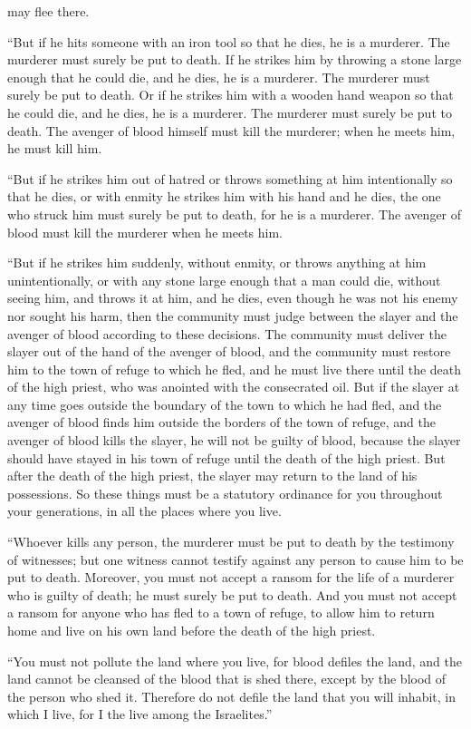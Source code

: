 {may flee
there.
\par }{\PP {}“But if
he hits someone
with an iron
tool
so
that he dies,
he is a murderer.
The murderer
must surely be put
to death.
If
he strikes
him by throwing a stone
large enough
that
he could
die,
and he dies,
he is a murderer.
The murderer
must surely be put to death.
Or
if he strikes
him
with
a wooden
hand
weapon
so that he could die,
and he dies,
he is a murderer.
The murderer
must surely be put to death.
The avenger
of blood
himself
must kill
the murderer;
when he meets
him, he must kill him.
\par }{\PP {}“But if
he strikes
him out
of hatred
or
throws
something at him intentionally
so that he dies,
or
with enmity
he strikes
him with his hand
and he dies,
the one who struck
him must
surely be put to death,
for he is
a murderer.
The avenger
of blood
must kill
the
murderer
when he meets him.
\par }{\PP {}“But if
he strikes
him suddenly,
without
enmity,
or
throws
anything
at him unintentionally,
or
with any
stone
large enough that
a man could die,
without seeing
him, and throws
it at
him,
and he dies,
even though
he was not
his enemy
nor
sought
his harm,
then the community
must judge
between
the slayer
and the avenger
of blood
according
to these
decisions.
The community
must deliver
the slayer
out of the hand
of the avenger
of blood,
and the
community
must restore
him to
the town
of refuge
to which
he fled,
and he must live
there
until
the death
of the high
priest,
who
was anointed
with the consecrated
oil.
But if
the slayer
at any time
goes outside
the boundary
of the town
to which
he had fled,
and the avenger
of blood
finds
him outside
the borders
of the town
of refuge,
and the avenger
of blood
kills
the slayer,
he will not
be guilty of blood,
because
the slayer should have stayed
in his town
of refuge
until
the death
of the high
priest.
But after
the death
of the high
priest,
the slayer
may return
to
the land
of his possessions.
So these
things must be a statutory
ordinance
for you throughout your generations,
in all
the places where you live.
\par }{\PP {}“Whoever kills
any person,
the murderer
must be put to death by the testimony
of witnesses;
but one
witness
cannot
testify
against any person
to cause him to be put to death.
Moreover, you must not
accept
a ransom
for the life
of a murderer
who
is
guilty
of death;
he must
surely
be put to death.
And you must not
accept
a ransom
for anyone who has fled
to
a town
of refuge,
to allow him to
return
home and live
on his own land
before
the death
of the high priest.
\par }{\PP {}“You must not
pollute
the
land
where
you
live, for
blood
defiles
the
land,
and the land
cannot
be cleansed
of the blood
that is
shed
there, except
by the blood
of the person
who
shed it.
Therefore do not
defile
the land
that
you
will inhabit,
in which
I
live,
for
I
the {}
live
among
the Israelites.”


}
